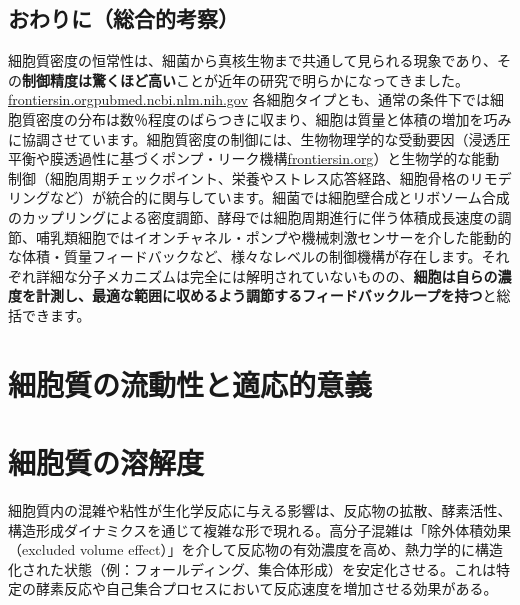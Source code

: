\subsection{おわりに（総合的考察）}

細胞質密度の恒常性は、細菌から真核生物まで共通して見られる現象であり、その\textbf{制御精度は驚くほど高い}ことが近年の研究で明らかになってきました。\href{https://www.frontiersin.org/journals/cell-and-developmental-biology/articles/10.3389/fcell.2022.1017499/full\#:~:text=match\%20at\%20L637\%20observed\%20CV,cell\%20volume\%20in\%20individual\%20cells}{frontiersin.org}\href{https://pubmed.ncbi.nlm.nih.gov/34100714/\#:~:text=variation\%20,dependent\%20density}{pubmed.ncbi.nlm.nih.gov} 各細胞タイプとも、通常の条件下では細胞質密度の分布は数％程度のばらつきに収まり、細胞は質量と体積の増加を巧みに協調させています。細胞質密度の制御には、生物物理学的な受動要因（浸透圧平衡や膜透過性に基づくポンプ・リーク機構\href{https://www.frontiersin.org/journals/cell-and-developmental-biology/articles/10.3389/fcell.2022.1017499/full\#:~:text=The\%20simplest\%20physical\%20model\%20of,pump\%20leak\%20mechanism\%20predicts\%20that}{frontiersin.org}）と生物学的な能動制御（細胞周期チェックポイント、栄養やストレス応答経路、細胞骨格のリモデリングなど）が統合的に関与しています。細菌では細胞壁合成とリボソーム合成のカップリングによる密度調節、酵母では細胞周期進行に伴う体積成長速度の調節、哺乳類細胞ではイオンチャネル・ポンプや機械刺激センサーを介した能動的な体積・質量フィードバックなど、様々なレベルの制御機構が存在します。それぞれ詳細な分子メカニズムは完全には解明されていないものの、\textbf{細胞は自らの濃度を計測し、最適な範囲に収めるよう調節するフィードバックループを持つ}と総括できます。

\section{細胞質の流動性と適応的意義}
\cite{persson2020viscoadaptation}
\section{細胞質の溶解度}
細胞質内の混雑や粘性が生化学反応に与える影響は、反応物の拡散、酵素活性、構造形成ダイナミクスを通じて複雑な形で現れる。高分子混雑は「除外体積効果（excluded volume effect）」を介して反応物の有効濃度を高め、熱力学的に構造化された状態（例：フォールディング、集合体形成）を安定化させる。これは特定の酵素反応や自己集合プロセスにおいて反応速度を増加させる効果がある。

